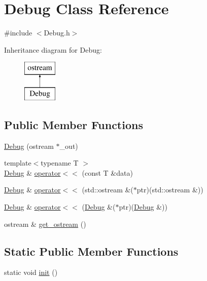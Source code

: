 \hypertarget{class_debug}{\section{Debug Class Reference}
\label{class_debug}
}


{\ttfamily \#include $<$Debug.\-h$>$}

Inheritance diagram for Debug\-:\begin{figure}[H]
\begin{center}
\leavevmode
\includegraphics[height=2.000000cm]{class_debug}
\end{center}
\end{figure}
\subsection*{Public Member Functions}
\begin{DoxyCompactItemize}
\item 
\hyperlink{class_debug_ab865c4f64637d49f5fed793824713294}{Debug} (ostream $\ast$\-\_\-out)
\item 
{\footnotesize template$<$typename T $>$ }\\\hyperlink{class_debug}{Debug} \& \hyperlink{class_debug_ad5812b399737871bada69fae4dbba5ec}{operator$<$$<$} (const T \&data)
\item 
\hyperlink{class_debug}{Debug} \& \hyperlink{class_debug_ab9d98c917063f74402ada8ba5298115a}{operator$<$$<$} (std\-::ostream \&($\ast$ptr)(std\-::ostream \&))
\item 
\hyperlink{class_debug}{Debug} \& \hyperlink{class_debug_a6e2f2283770dd91b0a3a2b269ca819b9}{operator$<$$<$} (\hyperlink{class_debug}{Debug} \&($\ast$ptr)(\hyperlink{class_debug}{Debug} \&))
\item 
ostream \& \hyperlink{class_debug_a4e353e9f6c0ec7ea6757d33fe11cd0c2}{get\-\_\-ostream} ()
\end{DoxyCompactItemize}
\subsection*{Static Public Member Functions}
\begin{DoxyCompactItemize}
\item 
static void \hyperlink{class_debug_acd04c0ecba145ac2998cf1c43e7b619b}{init} ()
\end{DoxyCompactItemize}
